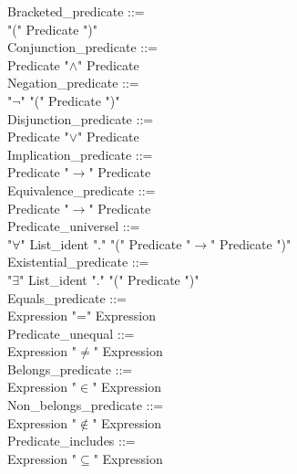 \documentclass[12pt,a4paper,draft]{article}
\begin{document}
{\begin{sloppypar}
Bracketed\_predicate ::= \\
\hspace*{0.20in}"("  Predicate  ")" \\
Conjunction\_predicate ::= \\
\hspace*{0.20in} Predicate  "$\land$"  Predicate\\
Negation\_predicate ::= \\
\hspace*{0.20in}"$\neg$" "(" Predicate ")" \\
Disjunction\_predicate ::= \\
\hspace*{0.20in} Predicate  "$\lor$"  Predicate\\
Implication\_predicate ::= \\
\hspace*{0.20in} Predicate  "$\rightarrow$"  Predicate\\
Equivalence\_predicate ::= \\
\hspace*{0.20in} Predicate  "$\rightarrow$"  Predicate\\
Predicate\_universel ::= \\
\hspace*{0.20in}"$\forall$" List\_ident "." "(" Predicate  "$\rightarrow$"  Predicate ")" \\
Existential\_predicate ::= \\
\hspace*{0.20in}"$\exists$" List\_ident "." "(" Predicate ")" \\
Equals\_predicate ::= \\
\hspace*{0.20in} Expression  "="  Expression\\
Predicate\_unequal ::= \\
\hspace*{0.20in} Expression  "$\neq$"  Expression \\
Belongs\_predicate ::= \\
\hspace*{0.20in} Expression  "$\in$"  Expression\\
Non\_belongs\_predicate ::= \\
\hspace*{0.20in} Expression  "$\notin$"  Expression\\
Predicate\_includes ::= \\
\hspace*{0.20in} Expression  "$\subseteq$"  Expression\\

\end{sloppypar}}
\end{document}
